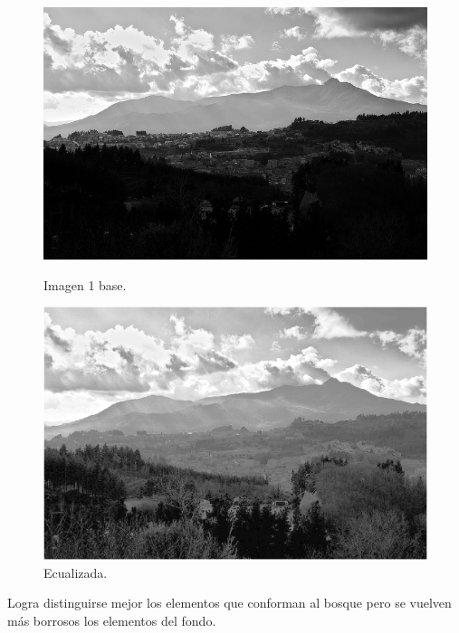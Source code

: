 \documentclass[11pt, letterpaper]{article}
\begin{document}
\begin{figure}[h!]
	\centering
	\begin{minipage}{0.48\textwidth} %
		\centering
		\includegraphics[width=\textwidth]{Imagen1.png}
		\caption{Imagen 1 base.}
		\label{fig:im1}
	\end{minipage}\hfill %
	\begin{minipage}{0.48\textwidth} %
		\centering
		\includegraphics[width=\textwidth]{R1.png}
		\caption{Ecualizada.}
		\label{fig:im1.1}
	\end{minipage}
\end{figure}


Logra distinguirse mejor los elementos que conforman al bosque pero se vuelven más borrosos los elementos del fondo.
\end{document}
